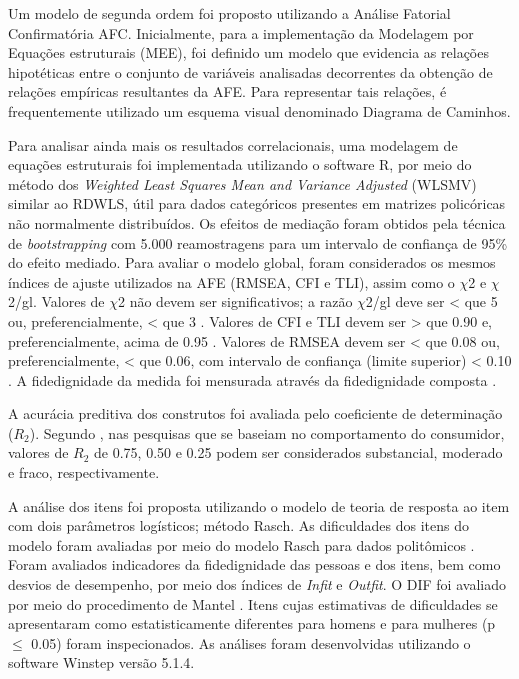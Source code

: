 Um modelo de segunda ordem foi proposto utilizando a Análise Fatorial Confirmatória AFC. Inicialmente, para a implementação da Modelagem por Equações estruturais (MEE), foi definido um modelo que evidencia as relações hipotéticas entre o conjunto de variáveis analisadas decorrentes da obtenção de relações empíricas resultantes da AFE. Para representar tais relações, é frequentemente utilizado um esquema visual denominado Diagrama de Caminhos. 

Para analisar ainda mais os resultados correlacionais, uma modelagem de equações estruturais foi implementada utilizando o software R, por meio do método dos \textit{Weighted Least Squares Mean and Variance Adjusted} (WLSMV) similar ao RDWLS, útil para dados categóricos presentes em matrizes policóricas não normalmente distribuídos. Os efeitos de mediação foram obtidos pela técnica de \textit{bootstrapping} com 5.000 reamostragens para um intervalo de confiança de 95\% do efeito mediado. 
Para avaliar o modelo global, foram considerados os mesmos índices de ajuste utilizados na AFE (RMSEA, CFI e TLI), assim como o $\chi$2 e $\chi$2/gl. Valores de $\chi$2 não devem ser significativos; a razão $\chi$2/gl deve ser < que 5 ou, preferencialmente, < que 3 \cite{Kline2016PrinciplesLivros}. Valores de CFI e TLI devem ser > que 0.90 e, preferencialmente, acima de 0.95 \cite{Sellbom2019FactorRecommendations}. Valores de RMSEA devem ser < que 0.08 ou, preferencialmente, < que 0.06, com intervalo de confiança (limite superior) < 0.10 \cite{Brown2015}. A fidedignidade da medida foi mensurada através da fidedignidade composta \cite{Raykov2016EstimationMeasures}.

A acurácia preditiva dos construtos foi avaliada pelo coeficiente de determinação ($R_2$). Segundo \cite{HairJr2021APLS-SEM}, nas pesquisas que se baseiam no comportamento do consumidor, valores de $R_2$ de 0.75, 0.50 e 0.25 podem ser considerados substancial, moderado e fraco, respectivamente.

A análise dos itens foi proposta utilizando o modelo de teoria de resposta ao item com dois parâmetros logísticos; método Rasch. As dificuldades dos itens do modelo foram avaliadas por meio do modelo Rasch para dados politômicos \cite{Andrich1978ACategories}. Foram avaliados indicadores da fidedignidade das pessoas e dos itens, bem como desvios de desempenho, por meio dos índices de \textit{Infit} e \textit{Outfit}. O DIF foi avaliado por meio do procedimento de Mantel \cite{Bond2013ApplyingSciences}. Itens cujas estimativas de dificuldades se apresentaram como estatisticamente diferentes para homens e para mulheres (p$\leq$ 0.05) foram inspecionados. As análises foram desenvolvidas utilizando o software Winstep versão 5.1.4.

